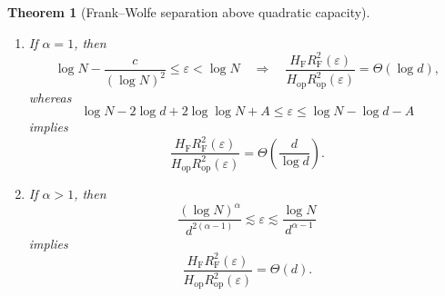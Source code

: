 \documentclass[11pt]{article}
\newtheorem{theorem}{Theorem}[section]
\newcommand{\eps}{\varepsilon}
\newcommand{\RF}{R_{\mathrm F}}
\newcommand{\Rop}{R_{\mathrm{op}}}
\newcommand{\HF}{H_{\mathrm F}}
\newcommand{\Hop}{H_{\mathrm{op}}}
\begin{document}
\begin{theorem}[Frank--Wolfe separation above quadratic capacity]
\begin{enumerate}[label=\textup{(\roman*)},leftmargin=2.2em]
\item If $\alpha=1$, then
\begin{equation}
 \log N-\frac{c}{(\log N)^2}\leq\eps<\log N
 \quad\Longrightarrow\quad
 \frac{\HF\RF^2(\eps)}{\Hop\Rop^2(\eps)}
 =\Theta(\log d),
 \label{eq:super-fw-alpha-one-local}
\end{equation}
whereas
\begin{equation}
 \log N-2\log d+2\log\log N+A
 \leq\eps\leq
 \log N-\log d-A
 \label{eq:super-fw-alpha-one-window}
\end{equation}
implies
\begin{equation}
 \frac{\HF\RF^2(\eps)}{\Hop\Rop^2(\eps)}
 =\Theta\!\left(\frac d{\log d}\right).
 \label{eq:super-fw-alpha-one-head}
\end{equation}

\item If $\alpha>1$, then
\begin{equation}
 \frac{(\log N)^\alpha}{d^{2(\alpha-1)}}
 \lesssim\eps\lesssim
 \frac{\log N}{d^{\alpha-1}}
 \label{eq:super-fw-above-one-window}
\end{equation}
implies
\begin{equation}
 \frac{\HF\RF^2(\eps)}{\Hop\Rop^2(\eps)}
 =\Theta(d).
 \label{eq:super-fw-above-one}
\end{equation}
\end{enumerate}
\end{theorem}
\end{document}
